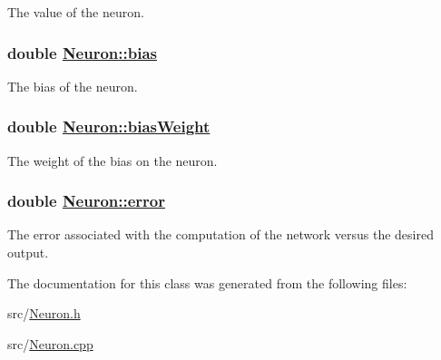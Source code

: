 The value of the neuron. \hypertarget{classNeuron_7dc59218069023c3b8348a353902b0ac}{
\subsubsection[bias]{\setlength{\rightskip}{0pt plus 5cm}double \hyperlink{classNeuron_7dc59218069023c3b8348a353902b0ac}{Neuron::bias}}}
\label{classNeuron_7dc59218069023c3b8348a353902b0ac}


The bias of the neuron. \hypertarget{classNeuron_27aa94b5d7658f718711cedb3f96dc7f}{
\subsubsection[biasWeight]{\setlength{\rightskip}{0pt plus 5cm}double \hyperlink{classNeuron_27aa94b5d7658f718711cedb3f96dc7f}{Neuron::bias\-Weight}}}
\label{classNeuron_27aa94b5d7658f718711cedb3f96dc7f}


The weight of the bias on the neuron. \hypertarget{classNeuron_d4d851d9f4f5dccb6283e5c19726e1e7}{
\subsubsection[error]{\setlength{\rightskip}{0pt plus 5cm}double \hyperlink{classNeuron_d4d851d9f4f5dccb6283e5c19726e1e7}{Neuron::error}}}
\label{classNeuron_d4d851d9f4f5dccb6283e5c19726e1e7}


The error associated with the computation of the network versus the desired output. 

The documentation for this class was generated from the following files:\begin{CompactItemize}
\item 
src/\hyperlink{Neuron_8h}{Neuron.h}\item 
src/\hyperlink{Neuron_8cpp}{Neuron.cpp}\end{CompactItemize}
